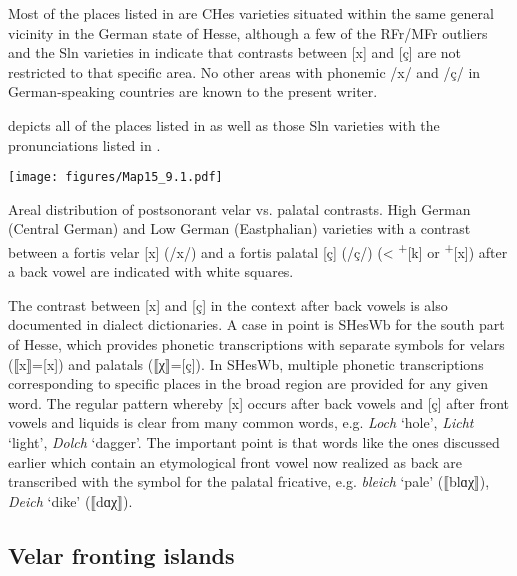 Most of the places listed in  are CHes varieties situated within the same general vicinity in the German state of Hesse, although a few of the RFr/MFr outliers and the Sln varieties in  indicate that contrasts between [x] and [ç] are not restricted to that specific area. No other areas with phonemic /x/ and /ç/ in German-speaking countries are known to the present writer. 

 depicts all of the places listed in  as well as those Sln varieties with the pronunciations listed in .

\begin{map}
\texttt{[image: figures/Map15\_9.1.pdf]}
 \caption[Areal distribution of postsonorant velar vs. palatal contrasts]{Areal distribution of postsonorant velar vs. palatal contrasts. High German (Central German) and Low German (Eastphalian) varieties with a contrast between a fortis velar [x] (/x/) and a fortis palatal [ç] (/ç/) (<  \textsuperscript{+}[k] or \textsuperscript{+}[x]) after a back vowel are indicated with white squares.}\label{map:15}
\end{map}

The contrast between [x] and [ç] in the context after back vowels is also documented in dialect dictionaries. A case in point is SHesWb for the south part of Hesse, which provides phonetic transcriptions with separate symbols for velars (⟦x⟧=[x]) and palatals (⟦χ⟧=[ç]). In SHesWb, multiple phonetic transcriptions corresponding to specific places in the broad region are provided for any given word. The regular pattern whereby [x] occurs after back vowels and [ç] after front vowels and liquids is clear from many common words, e.g. \textit{Loch} ‘hole’, \textit{Licht} ‘light’, \textit{Dolch} ‘dagger’. The important point is that words like the ones discussed earlier which contain an etymological front vowel now realized as back are transcribed with the symbol for the palatal fricative, e.g. \textit{bleich} ‘pale’ (⟦blɑχ⟧), \textit{Deich} ‘dike’ (⟦dɑχ⟧).

\subsection{Velar fronting islands}\label{sec:9.5.2}

